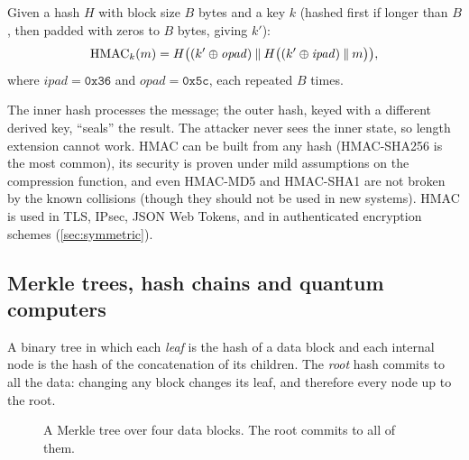 \begin{definition}
Given a hash $H$ with block size $B$ bytes and a key $k$ (hashed first if longer than $B$, then padded with zeros to $B$ bytes, giving $k'$):
\[
    \mathrm{HMAC}_k(m) = H\big( (k' \oplus \mathit{opad}) \mathbin{\|} H\big( (k' \oplus \mathit{ipad}) \mathbin{\|} m \big) \big),
\]
where $\mathit{ipad} = \texttt{0x36}$ and $\mathit{opad} = \texttt{0x5c}$, each repeated $B$ times.
\end{definition}

The inner hash processes the message; the outer hash, keyed with a different derived key, \enquote{seals} the result. The attacker never sees the inner state, so length extension cannot work. HMAC can be built from any hash (HMAC-SHA256 is the most common), its security is proven under mild assumptions on the compression function, and even HMAC-MD5 and HMAC-SHA1 are not broken by the known collisions (though they should not be used in new systems). HMAC is used in TLS, IPsec, JSON Web Tokens, and in authenticated encryption schemes (\cref{sec:symmetric}).

\subsection{Merkle trees, hash chains and quantum computers}

\begin{definition}
A binary tree in which each \emph{leaf} is the hash of a data block and each internal node is the hash of the concatenation of its children. The \emph{root} hash commits to all the data: changing any block changes its leaf, and therefore every node up to the root.
\end{definition}

\begin{figure}[H]
\centering
{}
\caption{A Merkle tree over four data blocks. The root commits to all of them.}
\label{fig:merkle-tree}
\end{figure}

